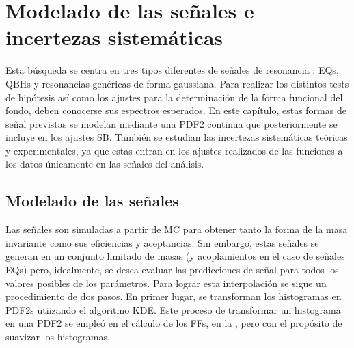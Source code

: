 \chapter{Modelado de las señales e incertezas sistemáticas}
\label{ch:signals}


Esta búsqueda se centra en tres tipos diferentes de señales de resonancia \gammajet: \acp{EQ}, \acp{QBH} y resonancias genéricas de forma gaussiana. Para realizar los distintos tests de hipótesis así como los ajustes para la determinación de la forma funcional del fondo, deben conocerse sus espectros \myj esperados.
En este capítulo, estas formas de señal previstas se modelan mediante una \ac{PDF2} continua que posteriormente se incluye en los ajustes \ac{SB}.
También se estudian las incertezas sistemáticas teóricas y experimentales, ya que estas entran en los ajustes realizados de las funciones a los datos \'unicamente en las señales del análisis.













\section{Modelado de las señales}
\label{sec:signals:modeling}

Las señales son simuladas a partir de \ac{MC} para obtener tanto la forma de la masa invariante como sus eficiencias y aceptancias. Sin embargo, estas señales se generan en un conjunto limitado de masas (y acoplamientos en el caso de señales \acp{EQ}) pero, idealmente, se desea evaluar las predicciones de señal para todos los valores posibles de los parámetros.
Para lograr esta interpolación se sigue un procedimiento de dos pasos. En primer lugar, se transforman los histogramas en \acp{PDF2} utiizando el algoritmo \ac{KDE}. Este proceso de transformar un histograma en una \ac{PDF2} se empleó en el cálculo de los \acp{FF}, en la \Sect{\ref{subsec:ss_corrections:ffs:calculation}}, pero con el propósito de suavizar los histogramas.


